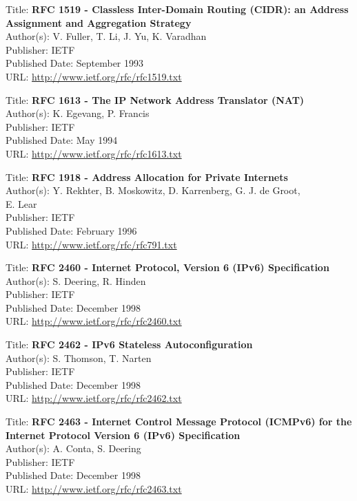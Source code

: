 Title: \textbf{RFC 1519 - Classless Inter-Domain Routing (CIDR): an Address} \\
\hspace{15mm} \textbf{Assignment and Aggregation Strategy} \\
Author(s): V. Fuller, T. Li, J. Yu, K. Varadhan \\
Publisher: IETF \\ 
Published Date: September 1993  \\
URL: \url{http://www.ietf.org/rfc/rfc1519.txt}   


Title: \textbf{RFC 1613 - The IP Network Address Translator (NAT)} \\
Author(s): K. Egevang, P. Francis \\
Publisher: IETF \\ 
Published Date: May 1994  \\
URL: \url{http://www.ietf.org/rfc/rfc1613.txt}   


Title: \textbf{RFC 1918 - Address Allocation for Private Internets} \\
Author(s): Y. Rekhter, B. Moskowitz, D. Karrenberg, G. J. de Groot, \\
\hspace{15mm} E. Lear \\ 
Publisher: IETF \\ 
Published Date: February 1996  \\
URL: \url{http://www.ietf.org/rfc/rfc791.txt}    


Title: \textbf{RFC 2460 - Internet Protocol, Version 6 (IPv6) Specification} \\
Author(s): S. Deering, R. Hinden \\
Publisher: IETF \\ 
Published Date: December 1998 \\ 
URL: \url{http://www.ietf.org/rfc/rfc2460.txt}   


Title: \textbf{RFC 2462 - IPv6 Stateless Autoconfiguration} \\
Author(s): S. Thomson, T. Narten \\
Publisher: IETF \\ 
Published Date: December 1998\\
URL: \url{http://www.ietf.org/rfc/rfc2462.txt}   


Title: \textbf{RFC 2463 - Internet Control Message Protocol (ICMPv6) for the} \\
\hspace{15mm} \textbf{Internet Protocol Version 6 (IPv6) Specification} \\
Author(s): A. Conta, S. Deering \\
Publisher: IETF \\ 
Published Date: December 1998 \\ 
URL: \url{http://www.ietf.org/rfc/rfc2463.txt}   


